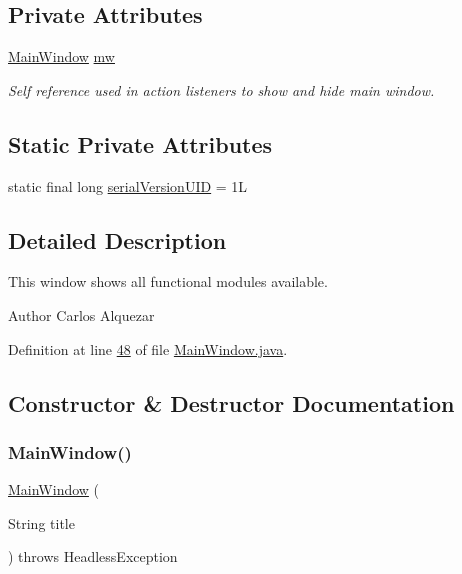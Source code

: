 \subsection*{Private Attributes}
\begin{DoxyCompactItemize}
\item 
\hyperlink{classgui_1_1_main_window}{Main\+Window} \hyperlink{classgui_1_1_main_window_aab2220fd8a9f6468b0b5e9f1ddf28729}{mw}
\begin{DoxyCompactList}\small\item\em Self reference used in action listeners to show and hide main window. \end{DoxyCompactList}\end{DoxyCompactItemize}
\subsection*{Static Private Attributes}
\begin{DoxyCompactItemize}
\item 
static final long \hyperlink{classgui_1_1_main_window_a3238d314ecdee14d2966760945d00c3b}{serial\+Version\+U\+ID} = 1L
\end{DoxyCompactItemize}


\subsection{Detailed Description}
This window shows all functional modules available. \begin{DoxyAuthor}{Author}
Carlos Alquezar 
\end{DoxyAuthor}


Definition at line \hyperlink{_main_window_8java_source_l00048}{48} of file \hyperlink{_main_window_8java_source}{Main\+Window.\+java}.



\subsection{Constructor \& Destructor Documentation}
\hypertarget{classgui_1_1_main_window_afe2ccfe7a8f33c8819567771cf151b0e}{}\label{classgui_1_1_main_window_afe2ccfe7a8f33c8819567771cf151b0e} 
\subsubsection{\texorpdfstring{Main\+Window()}{MainWindow()}}
{\footnotesize\ttfamily \hyperlink{classgui_1_1_main_window}{Main\+Window} (\begin{DoxyParamCaption}\item[{String}]{title }\end{DoxyParamCaption}) throws Headless\+Exception}



